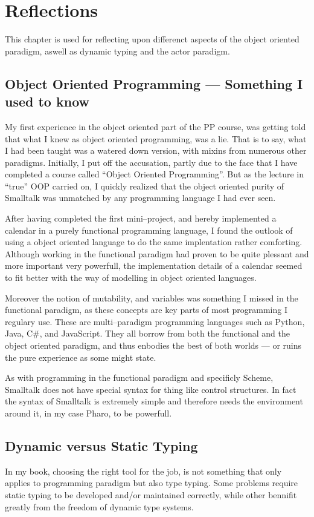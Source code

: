 \chapter{Reflections}
This chapter is used for reflecting upon differenct aspects of the object oriented paradigm, aswell as dynamic typing and the actor paradigm.

\section{Object Oriented Programming --- Something I used to know}
My first experience in the object oriented part of the PP course, was getting told that what I knew as object oriented programming, was a lie.
That is to say, what I had been taught was a watered down version, with mixins from numerous other paradigms.
Initially, I put off the accusation, partly due to the face that I have completed a course called \enquote{Object Oriented Programming}.
But as the lecture in \enquote{true} OOP carried on, I quickly realized that the object oriented purity of Smalltalk was unmatched by any programming language I had ever seen.

\bigskip
After having completed the first mini--project, and hereby implemented a calendar in a purely functional programming language,
I found the outlook of using a object oriented language to do the same implentation rather comforting.
Although working in the functional paradigm had proven to be quite plessant and more important very powerfull,
the implementation details of a calendar seemed to fit better with the way of modelling in object oriented languages.

\bigskip
Moreover the notion of mutability, and variables was something I missed in the functional paradigm, as these concepts are key parts of most programming I regulary use.
These are multi--paradigm programming languages such as Python, Java, C\#, and JavaScript.
They all borrow from both the functional and the object oriented paradigm, and thus enbodies the best of both worlds --- or ruins the pure experience as some might state.

\bigskip
As with programming in the functional paradigm and specificly Scheme, Smalltalk does not have special syntax for thing like control structures.
In fact the syntax of Smalltalk is extremely simple and therefore needs the environment around it, in my case Pharo, to be powerfull.

\section{Dynamic versus Static Typing}
In my book, choosing the right tool for the job, is not something that only applies to programming paradigm but also type typing.
Some problems require static typing to be developed and/or maintained correctly, while other bennifit greatly from the freedom of dynamic type systems.


